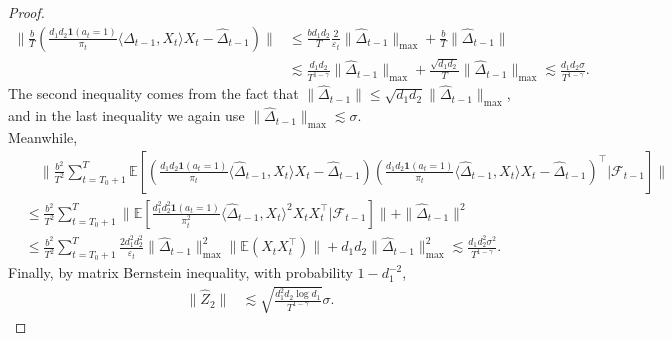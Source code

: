 \documentclass[12pt]{article}
\newcommand{\inp}[2]{\langle #1,#2\rangle}
\def\EE{{\mathbb E}}
\def\indicator{\mathbf{1}}
\theoremstyle{plain}
\begin{document}
\begin{proof}
    \begin{align*}
        \bigg\|\frac{b}{T}\left(\frac{d_1d_2\indicator(a_t=1)}{\pi_t}\inp{\widehat{\Delta}_{t-1}}{X_t}X_t-\widehat{\Delta}_{t-1}\right)\bigg\|&\leq\frac{bd_1d_2}{T}\frac{2}{\varepsilon_t}\|\widehat{\Delta}_{t-1}\|_{\max}+\frac{b}{T}\|\widehat{\Delta}_{t-1}\| \\
        &\lesssim \frac{d_1d_2}{T^{1-\gamma}}\|\widehat{\Delta}_{t-1}\|_{\max} + \frac{\sqrt{d_1d_2}}{T}\|\widehat{\Delta}_{t-1}\|_{\max} \lesssim \frac{d_1d_2\sigma}{T^{1-\gamma}}.
    \end{align*}
    The second inequality comes from the fact that $\|\widehat{\Delta}_{t-1}\|\leq \sqrt{d_1d_2}\|\widehat{\Delta}_{t-1}\|_{\max}$, and in the last inequality we again use $\|\widehat{\Delta}_{t-1}\|_{\max}\lesssim \sigma$. \\
    Meanwhile,
    \begin{align*}
        &\quad \bigg\|\frac{b^2}{T^2}\sum_{t=T_0+1}^{T}\EE\left[\left(\frac{d_1d_2\indicator(a_t=1)}{\pi_t}\inp{\widehat{\Delta}_{t-1}}{X_t}X_t-\widehat{\Delta}_{t-1}\right)\left(\frac{d_1d_2\indicator(a_t=1)}{\pi_t}\inp{\widehat{\Delta}_{t-1}}{X_t}X_t-\widehat{\Delta}_{t-1}\right)^{\top}\big|\mathcal{F}_{t-1}\right]\bigg\| \\
        &\leq \frac{b^2}{T^2}\sum_{t=T_0+1}^T \bigg\|\EE\left[\frac{d_1^2d_2^2\indicator(a_t=1)}{\pi_t^2}\inp{\widehat{\Delta}_{t-1}}{X_t}^2X_tX_t^{\top}\big|\mathcal{F}_{t-1}\right]\bigg\| + \|\widehat{\Delta}_{t-1}\|^2 \\
        &\leq \frac{b^2}{T^2}\sum_{t=T_0+1}^T \frac{2d_1^2d_2^2}{\varepsilon_t}\|\widehat{\Delta}_{t-1}\|_{\max}^2\|\EE(X_tX_t^{\top})\| + d_1d_2\|\widehat{\Delta}_{t-1}\|_{\max}^2 \lesssim \frac{d_1d_2^2\sigma^2}{T^{1-\gamma}}.
    \end{align*}
    Finally, by matrix Bernstein inequality, with probability $1-d_1^{-2}$,
    \begin{align*}
        \|\widehat{Z}_2\|&\lesssim \sqrt{\frac{d_1^2d_2\log d_1}{T^{1-\gamma}}}\sigma.
    \end{align*}
\end{proof}
\end{document}
